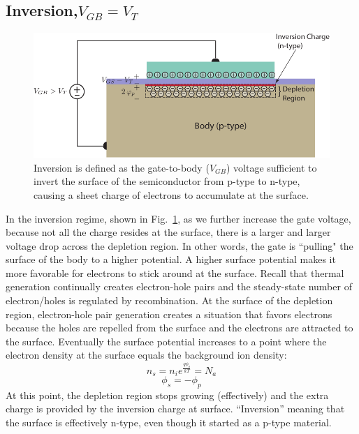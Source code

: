 \subsection{Inversion\texorpdfstring{,\;$V_{GB}=V_T$}{}}
\begin{figure}[tbh]
\centering
\includegraphics[width=.75\columnwidth]{mos_cap_inversion}
\caption{Inversion is defined as the gate-to-body ($V_{GB}$) voltage sufficient to invert the surface of the semiconductor from p-type to n-type, causing a sheet charge of electrons to accumulate at the surface.}
\label{fig:mos_inv}
\end{figure}
In the inversion regime, shown in Fig.~\ref{fig:mos_inv}, as we further increase the gate voltage, because not all the charge resides at the surface, there is a larger and larger voltage drop across the depletion region.  In other words, the gate is ``pulling" the surface of the body to a higher potential.  A higher surface potential makes it more favorable for electrons to stick around at the surface.  Recall that thermal generation continually creates electron-hole pairs and the steady-state number of electron/holes is regulated by recombination.  At the surface of the depletion region, electron-hole pair generation creates a situation that favors electrons because the holes are repelled from the surface and the electrons are attracted to the surface.  Eventually the surface potential increases to a point where the electron density at the surface equals the background ion density:
    \begin{equation}
        {n_s} = {n_i}{e^{\frac{{q{\phi _s}}}{{kT}}}} = {N_a}
    \end{equation}
    \begin{equation}
        {\phi _s} =  - {\phi _p}
    \end{equation}
At this point, the depletion region stops growing (effectively) and the extra charge is provided by the inversion charge at surface.  “Inversion” meaning that the surface is effectively n-type, even though it started as a p-type material.  
